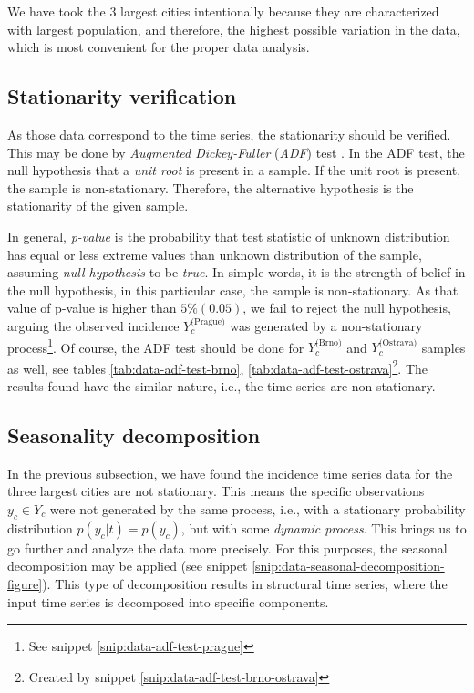 \documentclass[
  digital, %
  oneside, %
  lof,     %
  lot,     %
]{fithesis4}
\begin{document}
We have took the 3 largest cities intentionally because they
are characterized with largest population, and therefore, the 
highest possible variation in the data, which is most convenient 
for the proper data analysis.


\subsection{Stationarity verification}

As those data correspond to the time series, the stationarity 
should be verified. 
This may be done by \textit{Augmented Dickey-Fuller} (\textit{ADF}) 
test \cite{dickey1979}. 
In the ADF test, the null hypothesis that a \textit{unit root} is 
present in a sample. 
If the unit root is present, the sample is non-stationary. 
Therefore, the alternative hypothesis is the stationarity of 
the given sample.



In general, \textit{p-value} is the probability that test statistic 
of unknown distribution has equal or less extreme values 
than unknown distribution of the sample, assuming \textit{null 
hypothesis} to be \textit{true}. In simple words, it is the strength 
of belief in the null hypothesis, in this particular case, the sample is 
non-stationary. 
As that value of p-value is higher than $5\% (0.05)$, we fail to reject 
the null hypothesis, arguing the observed incidence 
$Y_c^\text{(Prague)}$ was generated by a non-stationary 
process\footnote{See snippet \ref{snip:data-adf-test-prague}}. 
Of course, the ADF test should be done for $Y_c^\text{(Brno)}$ 
and $Y_c^\text{(Ostrava)}$ samples as well, 
see tables \ref{tab:data-adf-test-brno}, \ref{tab:data-adf-test-ostrava}\footnote{Created by snippet \ref{snip:data-adf-test-brno-ostrava}}.
The results found have the similar nature, i.e.,
the time series are non-stationary.

\subsection{Seasonality decomposition}
\label{sec:seasonality-decomposition}

In the previous subsection, we have found the incidence time 
series data for the three largest cities are not stationary. 
This means the specific observations $y_c \in Y_c$ were not 
generated by the same process, i.e., with a stationary probability
distribution $p(y_c | t) = p(y_c)$, but with some \textit{dynamic process}. 
This brings us to go further and analyze the data more precisely. 
For this purposes, the seasonal decomposition may be applied 
(see snippet \ref{snip:data-seasonal-decomposition-figure}). 
This type of decomposition results in structural time series, 
where the input time series is decomposed into specific 
components.
\end{document}
